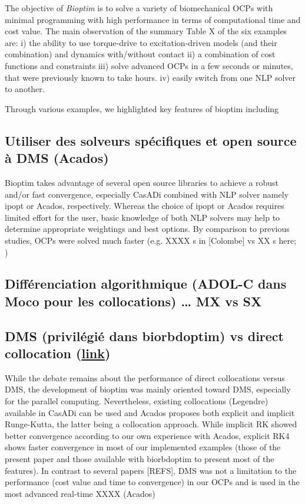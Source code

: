 The objective of \textit{Bioptim} is to solve a variety of biomechanical OCPs with minimal programming with high performance in terms of computational time and cost value. The main observation of the summary Table X of the six examples are: 
i) the ability to use torque-drive to excitation-driven models (and their combination) and dynamics with/without contact 
ii) a combination of cost functions and constraints 
iii) solve advanced OCPs in a few seconds or minutes, that were previously known to take hours. 
iv) easily switch from one NLP solver to another.


Through various examples, we highlighted key features of bioptim including 


\subsection{Utiliser des solveurs spécifiques et open source à DMS (Acados)}

Bioptim takes advantage of several open source libraries to achieve a robust and/or fast convergence, especially CasADi combined with NLP solver namely ipopt or Acados, respectively. Whereas the choice of ipopt or Acados requires limited effort for the user, basic knowledge of both NLP solvers may help to determine appropriate weightings and best options. 
By comparison to previous studies, OCPs were solved much faster  (e.g. XXXX s in [Colombe] vs XX s here; )




\subsection{Différenciation algorithmique (ADOL-C dans Moco pour les collocations) … MX vs SX}



\subsection{DMS (privilégié dans biorbdoptim) vs direct collocation (\href{https://link.springer.com/chapter/10.1007/978-3-540-36119-0_4}{link})}


While the debate remains about the performance of direct collocations versus DMS, the development of bioptim was mainly oriented toward DMS, especially for the parallel computing. Nevertheless, existing collocations (Legendre) available in CasADi can be used and Acados proposes both explicit and implicit Runge-Kutta, the latter being a collocation approach. While implicit RK showed better convergence according to our own experience with Acados, explicit RK4 shows faster convergence in most of our implemented examples (those of the present paper and those available with biorbdoptim to present most of the features). In contrast to several papers [REFS], DMS was not a limitation to the performance (cost value and time to convergence) in our OCPs and is used in the most advanced real-time XXXX (Acados)

